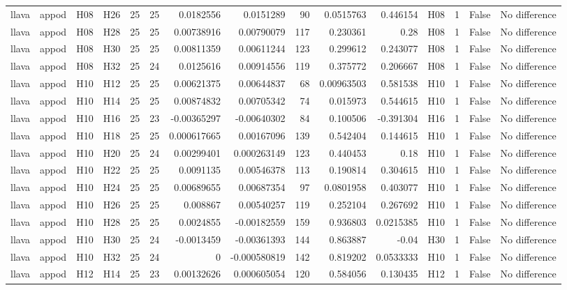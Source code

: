 \begin{longtable}{llllrrrrrrrlrrl}
llava & appod & H08 & H26 & 25 & 25 & 0.0182556 & 0.0151289 & 90 & 0.0515763 & 0.446154 & H08 & 1 & False & No difference \\
llava & appod & H08 & H28 & 25 & 25 & 0.00738916 & 0.00790079 & 117 & 0.230361 & 0.28 & H08 & 1 & False & No difference \\
llava & appod & H08 & H30 & 25 & 25 & 0.00811359 & 0.00611244 & 123 & 0.299612 & 0.243077 & H08 & 1 & False & No difference \\
llava & appod & H08 & H32 & 25 & 24 & 0.0125616 & 0.00914556 & 119 & 0.375772 & 0.206667 & H08 & 1 & False & No difference \\
llava & appod & H10 & H12 & 25 & 25 & 0.00621375 & 0.00644837 & 68 & 0.00963503 & 0.581538 & H10 & 1 & False & No difference \\
llava & appod & H10 & H14 & 25 & 25 & 0.00874832 & 0.00705342 & 74 & 0.015973 & 0.544615 & H10 & 1 & False & No difference \\
llava & appod & H10 & H16 & 25 & 23 & -0.00365297 & -0.00640302 & 84 & 0.100506 & -0.391304 & H16 & 1 & False & No difference \\
llava & appod & H10 & H18 & 25 & 25 & 0.000617665 & 0.00167096 & 139 & 0.542404 & 0.144615 & H10 & 1 & False & No difference \\
llava & appod & H10 & H20 & 25 & 24 & 0.00299401 & 0.000263149 & 123 & 0.440453 & 0.18 & H10 & 1 & False & No difference \\
llava & appod & H10 & H22 & 25 & 25 & 0.0091135 & 0.00546378 & 113 & 0.190814 & 0.304615 & H10 & 1 & False & No difference \\
llava & appod & H10 & H24 & 25 & 25 & 0.00689655 & 0.00687354 & 97 & 0.0801958 & 0.403077 & H10 & 1 & False & No difference \\
llava & appod & H10 & H26 & 25 & 25 & 0.008867 & 0.00540257 & 119 & 0.252104 & 0.267692 & H10 & 1 & False & No difference \\
llava & appod & H10 & H28 & 25 & 25 & 0.0024855 & -0.00182559 & 159 & 0.936803 & 0.0215385 & H10 & 1 & False & No difference \\
llava & appod & H10 & H30 & 25 & 24 & -0.0013459 & -0.00361393 & 144 & 0.863887 & -0.04 & H30 & 1 & False & No difference \\
llava & appod & H10 & H32 & 25 & 24 & 0 & -0.000580819 & 142 & 0.819202 & 0.0533333 & H10 & 1 & False & No difference \\
llava & appod & H12 & H14 & 25 & 23 & 0.00132626 & 0.000605054 & 120 & 0.584056 & 0.130435 & H12 & 1 & False & No difference \\

\end{longtable}
